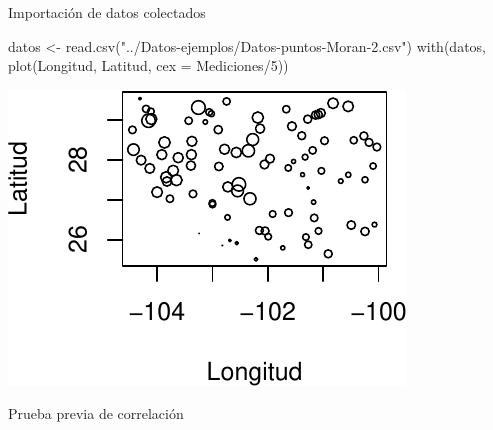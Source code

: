 \documentclass[
  11pt,
  ignorenonframetext,
]{beamer}
\newenvironment{Shaded}{}{}
\newcommand{\AttributeTok}[1]{\textcolor[rgb]{0.49,0.56,0.16}{#1}}
\newcommand{\DecValTok}[1]{\textcolor[rgb]{0.25,0.63,0.44}{#1}}
\newcommand{\FunctionTok}[1]{\textcolor[rgb]{0.02,0.16,0.49}{#1}}
\newcommand{\NormalTok}[1]{#1}
\newcommand{\OtherTok}[1]{\textcolor[rgb]{0.00,0.44,0.13}{#1}}
\newcommand{\SpecialCharTok}[1]{\textcolor[rgb]{0.25,0.44,0.63}{#1}}
\newcommand{\StringTok}[1]{\textcolor[rgb]{0.25,0.44,0.63}{#1}}
\begin{document}
\begin{frame}[fragile]{Importación de datos colectados}
\protect\hypertarget{importaciuxf3n-de-datos-colectados}{}
\begin{Shaded}
\begin{Highlighting}[]
\NormalTok{datos }\OtherTok{\textless{}{-}} \FunctionTok{read.csv}\NormalTok{(}\StringTok{"../Datos{-}ejemplos/Datos{-}puntos{-}Moran{-}2.csv"}\NormalTok{)}
\FunctionTok{with}\NormalTok{(datos, }\FunctionTok{plot}\NormalTok{(Longitud, Latitud, }\AttributeTok{cex =}\NormalTok{ Mediciones}\SpecialCharTok{/}\DecValTok{5}\NormalTok{))}
\end{Highlighting}
\end{Shaded}

\begin{center}\includegraphics{Usos-Moran_files/figure-beamer/unnamed-chunk-1-1} \end{center}
\end{frame}

\begin{frame}[fragile]{Prueba previa de correlación}
\protect\hypertarget{prueba-previa-de-correlaciuxf3n}{}
\begin{Shaded}
\end{Shaded}
\end{frame}
\end{document}
